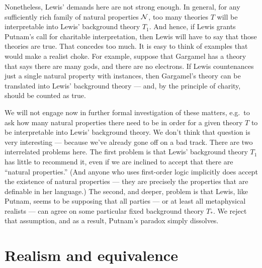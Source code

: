Nonetheless, Lewis' demands here are not strong enough.  In general,
for any sufficiently rich family of natural properties $\cal N$, too many
theories $T$ will be interpretable into Lewis' background theory
$T_1$.  And hence, if Lewis grants Putnam's call for charitable
interpretation, then Lewis will have to say that those theories are
true.  That concedes too much.  It is easy to think of examples that
would make a realist choke.  For example, suppose that Gargamel has a
theory that says there are many gods, and there are no electrons.  If
Lewis countenances just a single natural property with instances, then
Gargamel's theory can be translated into Lewis' background theory ---
and, by the principle of charity, should be counted as true.

We will not engage now in further formal investigation of these
matters, e.g.\ to ask how many natural properties there need to be in
order for a given theory $T$ to be interpretable into Lewis'
background theory.  We don't think that question is very interesting
--- because we've already gone off on a bad track.  There are two
interrelated problems here.  The first problem is that Lewis'
background theory $T_1$ has little to recommend it, even if we are
inclined to accept that there are ``natural properties.''  (And anyone
who uses first-order logic implicitly does accept the existence of
natural properties --- they are precisely the properties that are
definable in her language.)  The second, and deeper, problem is that
Lewis, like Putnam, seems to be supposing that all parties --- or at
least all metaphysical realists --- can agree on some particular fixed
background theory $T_\ast$.  We reject that assumption, and as a
result, Putnam's paradox simply dissolves.

















\section{Realism and equivalence}

